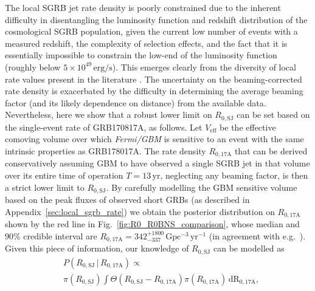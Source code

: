 \documentclass[]{aa}
\newcommand{\resp}[1]{#1}
\newcommand{\resptwo}[1]{#1}
\begin{document}
The local SGRB \resp{jet} rate density is poorly constrained due to the inherent difficulty in disentangling the luminosity function and redshift distribution of the cosmological \resp{SGRB} population, given the current low number of events with a measured redshift, the complexity of selection effects, and the fact that it is essentially impossible to constrain the low-end of the luminosity function (roughly below $5\times 10^{49}\,\mathrm{erg/s}$). This emerges clearly from the diversity of local rate values present in the literature \citep{Abbott2021_SGRBsearch,Mandel2021rates,Tan2020,Liu2019,Sun2017, Ghirlanda2016,Wanderman2015,Coward2012}. \resp{The uncertainty on the beaming-corrected rate density} is exacerbated by the difficulty in determining the average beaming factor (and its likely dependence on distance) from the available data. Nevertheless, \resp{here we show that a robust} lower limit on $R_\mathrm{0,SJ}$ \resp{can be} set \resp{based on} the single-event rate of GRB170817A, \resp{as follows. Let $V_\mathrm{eff}$ be the effective comoving volume over which \textit{Fermi/GBM} is sensitive to an event with the same intrinsic properties as GRB178017A. The rate density $R_{0,\mathrm{17A}}$ that can be derived conservatively assuming GBM to have observed a single SGRB jet in that volume over its entire time of operation $T=13\,\mathrm{yr}$, neglecting any beaming factor, is then a strict lower limit to $R_\mathrm{0,SJ}$.} 
By carefully modelling the GBM sensitive volume \resptwo{based on the peak fluxes of observed short GRBs} (as described in Appendix~\ref{sec:local_sgrb_rate}) we obtain \resp{the posterior distribution on $R_\mathrm{0,17A}$ shown by the red line in Fig.~\ref{fig:R0_R0BNS_comparison}, whose median and 90\% credible interval are} $R_\mathrm{0,17A}=342_{-337}^{+1800}\,\mathrm{Gpc^{-3}\,yr^{-1}}$ \resptwo{(in agreement with e.g.\ \citealt{DellaValle2018})}. Given this piece of information, %
our knowledge of $R_\mathrm{0,SJ}$ \resp{can be modelled as}
\begin{equation}
\begin{split}
 & P(R_\mathrm{0,SJ}\,|\,R_\mathrm{0,17A})\propto \\
 & \pi(R_\mathrm{0,SJ})\int \Theta(R_\mathrm{0,SJ}-R_\mathrm{0,17A})\pi(R_\mathrm{0,17A})\,\mathrm{dR_\mathrm{0,17A}},
\end{split}
\label{eq:PR0SJ}
\end{equation}
\end{document}
